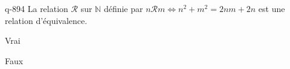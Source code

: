 \begin{truefalse}{q-894}
La relation $\mathcal R$ sur $\mathbb N$ définie par $n\mathcal R m \iff n^2+m^2 = 2nm+2n$ est une relation d'équivalence.
\item Vrai
\item* Faux
\end{truefalse}

